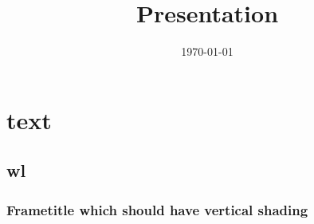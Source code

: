 \documentclass{beamer}
\title{Presentation}
\subtitle{}
\author{}
\institute{}
\date{\today}
\begin{document}
\begin{frame}
    \titlepage{}
\end{frame}

\section{text}
\subsection{wl}
\begin{frame}
    \frametitle{Frametitle which should have vertical shading}
\end{frame}
\end{document}
